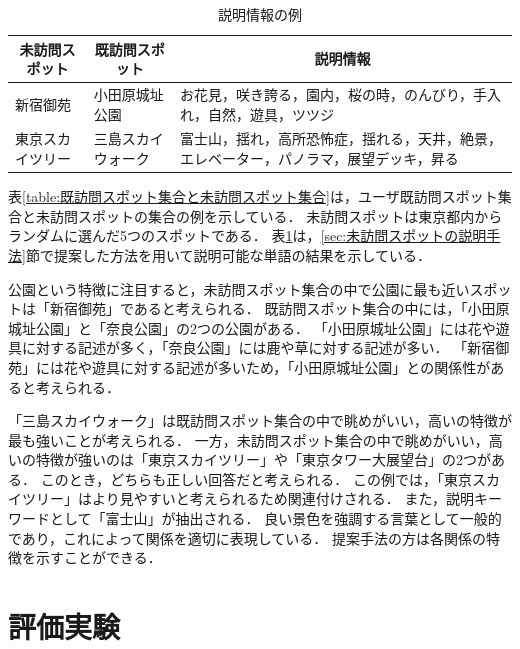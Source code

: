 \documentclass{deimj}
\begin{document}
\begin{table}[t]
  \caption{説明情報の例}
  \label{table:説明情報の例}
  \centering
  \begin{tabular}{l|l|l}
  \hline
  \multicolumn{1}{c|}{未訪問スポット} & \multicolumn{1}{c|}{既訪問スポット} & \multicolumn{1}{c}{説明情報}                     \\ \hline
  新宿御苑                      & 小田原城址公園                         & お花見，咲き誇る，園内，桜の時，のんびり，手入れ，自然，遊具，ツツジ          \\
  東京スカイツリー                     & 三島スカイウォーク                    & 富士山，揺れ，高所恐怖症，揺れる，天井，絶景，エレベーター，パノラマ，展望デッキ，昇る \\ \hline
  \end{tabular}
\end{table}

表\ref{table:既訪問スポット集合と未訪問スポット集合}は，ユーザ既訪問スポット集合と未訪問スポットの集合の例を示している．
未訪問スポットは東京都内からランダムに選んだ5つのスポットである．
表\ref{table:説明情報の例}は，\ref{sec:未訪問スポットの説明手法}節で提案した方法を用いて説明可能な単語の結果を示している．

公園という特徴に注目すると，未訪問スポット集合の中で公園に最も近いスポットは「新宿御苑」であると考えられる．
既訪問スポット集合の中には，「小田原城址公園」と「奈良公園」の2つの公園がある．
「小田原城址公園」には花や遊具に対する記述が多く，「奈良公園」には鹿や草に対する記述が多い．
「新宿御苑」には花や遊具に対する記述が多いため，「小田原城址公園」との関係性があると考えられる．

「三島スカイウォーク」は既訪問スポット集合の中で眺めがいい，高いの特徴が最も強いことが考えられる．
一方，未訪問スポット集合の中で眺めがいい，高いの特徴が強いのは「東京スカイツリー」や「東京タワー大展望台」の2つがある．
このとき，どちらも正しい回答だと考えられる．
この例では，「東京スカイツリー」はより見やすいと考えられるため関連付けされる．
また，説明キーワードとして「富士山」が抽出される．
良い景色を強調する言葉として一般的であり，これによって関係を適切に表現している．
提案手法の方は各関係の特徴を示すことができる．

\section{評価実験}
\label{sec:評価実験}
\end{document}
